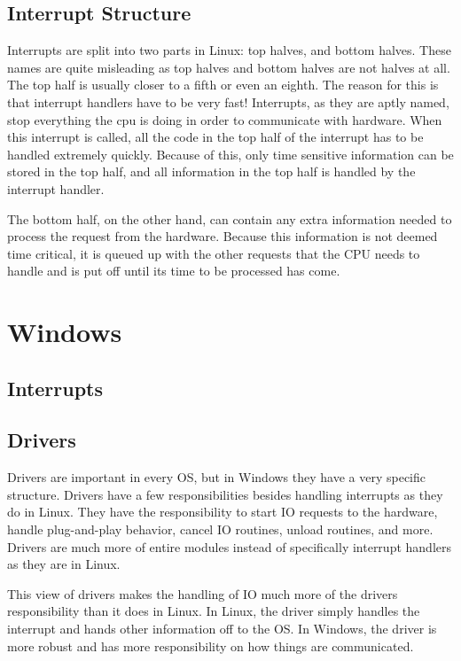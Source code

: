 \documentclass[10pt,letterpaper,onecolumn,draftclsnofoot]{IEEEtran}
\begin{document}
  \subsection{Interrupt Structure}
  Interrupts are split into two parts in Linux: top halves, and bottom halves.
  These names are quite misleading as top halves and bottom halves are not halves
  at all. The top half is usually closer to a fifth or even an eighth. The reason
  for this is that interrupt handlers have to be very fast! Interrupts, as they
  are aptly named, stop everything the cpu is doing in order to communicate with
  hardware. When this interrupt is called, all the code in the top half of the
  interrupt has to be handled extremely quickly. Because of this, only time sensitive
  information can be stored in the top half, and all information in the top half
  is handled by the interrupt handler.

  The bottom half, on the other hand, can contain any extra information needed
  to process the request from the hardware. Because this information is not deemed
  time critical, it is queued up with the other requests that the CPU needs to handle
  and is put off until its time to be processed has come. \cite{robertlove2010}

\section{Windows}
 \subsection{Interrupts}
 \subsection{Drivers}
 Drivers are important in every OS, but in Windows they have a very specific
 structure. Drivers have a few responsibilities besides handling interrupts as
 they do in Linux. They have the responsibility to start IO requests to the hardware,
 handle plug-and-play behavior, cancel IO routines, unload routines, and more.
 Drivers are much more of entire modules instead of specifically interrupt handlers
 as they are in Linux. \cite{internals2}

 This view of drivers makes the handling of IO much more of the drivers responsibility
 than it does in Linux. In Linux, the driver simply handles the interrupt and hands
 other information off to the OS. In Windows, the driver is more robust and has
 more responsibility on how things are communicated.
\end{document}
